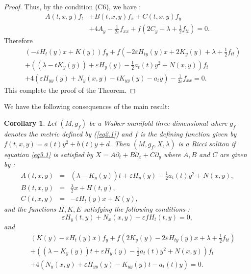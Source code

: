 \documentclass[reqno, 12pt]{amsart}
\numberwithin{equation}{section}
\newtheorem{corollary}[theorem]{Corollary}
\begin{document}
\begin{proof}
Thus, by the condition (C6), we have  :
\begin{align*}
A(t,x,y)f_t & + B(t,x,y)f_x + C(t,x,y) f_y\\
& + 4A_y - \frac{1}{2\varepsilon}f_{xx}  + f\left( 2C_y +\lambda
+ \frac{1}{2}f_{tt}\right)  =0.
\end{align*}
Therefore
\begin{align*}
&& \left(-\varepsilon H_{t}(y)x + K(y)\right) f_y + f\left( -2\varepsilon H_{ty}(y)x
+ 2K_y(y) +\lambda+  \frac{1}{2}f_{tt}\right)\nonumber  \\
&& + \left( ( \lambda - tK_y(y)) + \varepsilon H_{y}(y) - \frac{1}{2}a_{t}(t)y^2 
+ N(x,y)\right) f_t\nonumber\\
&& + 4\left(\varepsilon H_{yy}(y) + N_y(x,y) - tK_{yy}(y) - a_ty \right) 
-\frac{1}{2\varepsilon}f_{xx}=0.
		\end{align*}	
This complete the proof of the Theorem.
\end{proof}
 

We have the following consequences of the main result:

\begin{corollary}
Let $(M, g_f)$ be a Walker manifold three-dimensional where $g_f$ denotes 
the metric defined by (\ref{eq2.1}) and $f$ is the defining function given by 
$f(t,x,y)=a(t) y^{2}+b(t) y+d$. Then $(M, g_f, X, \lambda)$ is a Ricci soliton 
if equation \eqref{eq3.1} is satisfied by 
$X = A\partial_t+ B\partial_x + C \partial_y $ where $A, B $ and $C$ are given by :
\begin{eqnarray}\label{eq3.7}
A(t,x, y)&=& \left( \lambda - K_y(y)\right)t + \varepsilon H_{y}(y)
 - \frac{1}{2}a_{t}(t)y^2 + N(x,y), \nonumber\\ 
 B(t,x,y) &=& \frac{\lambda}{2}x + H(t,y),\nonumber\\
 C(t,x,y)&=& -\varepsilon H_{t}(y)x+K(y),
\end{eqnarray} 
and the functions $H, K, E$ satisfying the following conditions :
\begin{equation*}
\varepsilon H_{y}(t,y)+N_{x}(x,y)-\varepsilon fH_{t}(t,y)=0,
\end{equation*}
and
\begin{align*}
&&\left(K(y) - \varepsilon H_{t}(y)x\right) f_y + f\left(2K_y(y)
- 2\varepsilon H_{ty}(y)x +\lambda + \frac{1}{2}f_{tt}\right)\nonumber  \\
&& + \left( \left( \lambda - K_y(y)\right)t + \varepsilon H_{y}(y)
- \frac{1}{2}a_{t}(t)y^2 +N(x,y)\right) f_t\nonumber\\
&& + 4\left( N_y(x,y) + \varepsilon H_{yy}(y) - K_{yy}(y)t
- a_t(t)y \right) = 0.
\end{align*}
\end{corollary}
\end{document}
